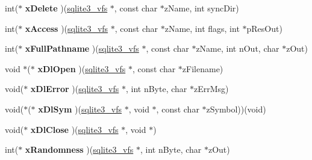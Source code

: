 \begin{DoxyCompactItemize}
\item 
\hypertarget{structsqlite3__vfs_a5f547a3e54f91c7ebef140d51054bbc0}{int($\ast$ {\bfseries x\+Delete} )(\hyperlink{structsqlite3__vfs}{sqlite3\+\_\+vfs} $\ast$, const char $\ast$z\+Name, int sync\+Dir)}\label{structsqlite3__vfs_a5f547a3e54f91c7ebef140d51054bbc0}

\item 
\hypertarget{structsqlite3__vfs_ab4344474034c2dbc9223a362c65ff235}{int($\ast$ {\bfseries x\+Access} )(\hyperlink{structsqlite3__vfs}{sqlite3\+\_\+vfs} $\ast$, const char $\ast$z\+Name, int flags, int $\ast$p\+Res\+Out)}\label{structsqlite3__vfs_ab4344474034c2dbc9223a362c65ff235}

\item 
\hypertarget{structsqlite3__vfs_a02fafc56d26adab5f236df6493a8bd55}{int($\ast$ {\bfseries x\+Full\+Pathname} )(\hyperlink{structsqlite3__vfs}{sqlite3\+\_\+vfs} $\ast$, const char $\ast$z\+Name, int n\+Out, char $\ast$z\+Out)}\label{structsqlite3__vfs_a02fafc56d26adab5f236df6493a8bd55}

\item 
\hypertarget{structsqlite3__vfs_ad6587e730f4f8bce2b0129664a9a86b9}{void $\ast$($\ast$ {\bfseries x\+Dl\+Open} )(\hyperlink{structsqlite3__vfs}{sqlite3\+\_\+vfs} $\ast$, const char $\ast$z\+Filename)}\label{structsqlite3__vfs_ad6587e730f4f8bce2b0129664a9a86b9}

\item 
\hypertarget{structsqlite3__vfs_a3cda3a00a43861cef4d5554354cdfda4}{void($\ast$ {\bfseries x\+Dl\+Error} )(\hyperlink{structsqlite3__vfs}{sqlite3\+\_\+vfs} $\ast$, int n\+Byte, char $\ast$z\+Err\+Msg)}\label{structsqlite3__vfs_a3cda3a00a43861cef4d5554354cdfda4}

\item 
\hypertarget{structsqlite3__vfs_a20ef3dacb974e3e480782629cbbf7534}{void($\ast$($\ast$ {\bfseries x\+Dl\+Sym} )(\hyperlink{structsqlite3__vfs}{sqlite3\+\_\+vfs} $\ast$, void $\ast$, const char $\ast$z\+Symbol))(void)}\label{structsqlite3__vfs_a20ef3dacb974e3e480782629cbbf7534}

\item 
\hypertarget{structsqlite3__vfs_adaa986b55a44971e7048d160ac5071ad}{void($\ast$ {\bfseries x\+Dl\+Close} )(\hyperlink{structsqlite3__vfs}{sqlite3\+\_\+vfs} $\ast$, void $\ast$)}\label{structsqlite3__vfs_adaa986b55a44971e7048d160ac5071ad}

\item 
\hypertarget{structsqlite3__vfs_ace3fcb41cb01a947457532f645ba4c88}{int($\ast$ {\bfseries x\+Randomness} )(\hyperlink{structsqlite3__vfs}{sqlite3\+\_\+vfs} $\ast$, int n\+Byte, char $\ast$z\+Out)}\label{structsqlite3__vfs_ace3fcb41cb01a947457532f645ba4c88}


\end{DoxyCompactItemize}
